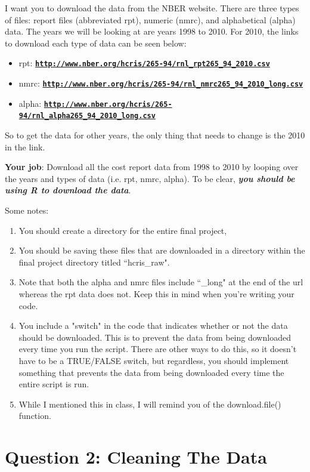 \documentclass{article}
\begin{document}
I want you to download the data from the NBER website. There are three types of files: report files (abbreviated rpt), numeric (nmrc), and alphabetical (alpha) data. The years we will be looking at are years 1998 to 2010. For 2010, the links to download each type of data can be seen below:
\begin{itemize}
	\item rpt: \href{http://www.nber.org/hcris/265-94/rnl_rpt265_94_2010.csv}{\tt\bf http://www.nber.org/hcris/265-94/rnl\_rpt265\_94\_2010.csv}
	\item nmrc: \href{http://www.nber.org/hcris/265-94/rnl_nmrc265_94_2010_long.csv}{\tt\bf http://www.nber.org/hcris/265-94/rnl\_nmrc265\_94\_2010\_long.csv}
	\item alpha: \href{http://www.nber.org/hcris/265-94/rnl_alpha265_94_2010_long.csv}{\tt\bf http://www.nber.org/hcris/265-94/rnl\_alpha265\_94\_2010\_long.csv}
\end{itemize}
So to get the data for other years, the only thing that needs to change is the 2010 in the link.

\textbf{Your job}: Download all the cost report data from 1998 to 2010 by looping over the years and types of data (i.e. rpt, nmrc, alpha). To be clear, \textit{\textbf{you should be using R to download the data}}.

Some notes: 
\begin{enumerate}
	\item You should create a directory for the entire final project,
	\item You should be saving these files that are downloaded in a directory within the final project directory titled ``hcris\_raw".
	\item Note that both the alpha and nmrc files include ``\_long" at the end of the url whereas the rpt data does not. Keep this in mind when you're writing your code.
	\item You include a "switch" in the code that indicates whether or not the data should be downloaded. This is to prevent the data from being downloaded every time you run the script. There are other ways to do this, so it doesn't have to be a TRUE/FALSE switch, but regardless, you should implement something that prevents the data from being downloaded every time the entire script is run.
	\item While I mentioned this in class, I will remind you of the download.file() function.
\end{enumerate}

\section*{Question 2: Cleaning The Data}
\end{document}
